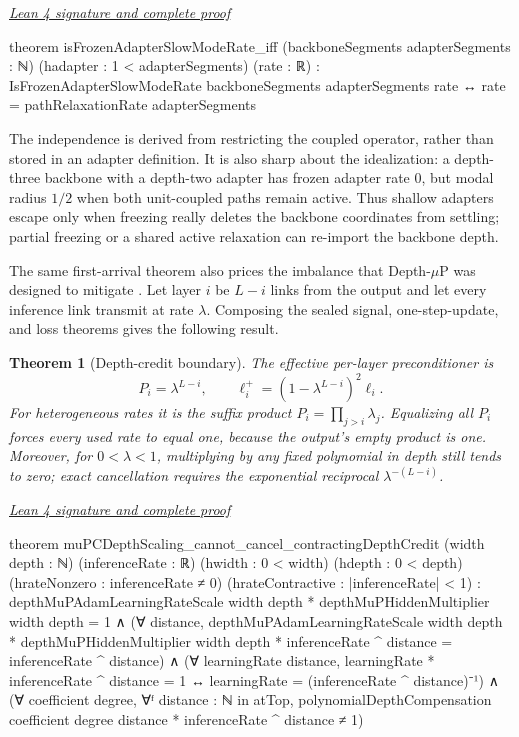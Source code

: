 \documentclass[11pt]{article}
\newtheorem{theorem}{Theorem}[section]
\newcommand{\leancommit}{647168959fc57cfe97526d9525d33e63681b8e2f}
\newcommand{\leansignaturelink}[2]{%
  \par\Needspace{0.3\textheight}\smallskip\noindent
  \href{https://github.com/zariuq/MeTTapedia/blob/\leancommit/#1\#L#2}{%
    \scriptsize\itshape Lean 4 signature and complete proof}\par\nobreak}
\begin{document}
\leansignaturelink{lean/mettapedia/Mettapedia/MachineLearning/NeuralNetworks/%
PredictiveCoding/FrozenAdapterRestriction.lean}{233}
\begin{leansignature}
theorem isFrozenAdapterSlowModeRate_iff
    (backboneSegments adapterSegments : ℕ)
    (hadapter : 1 < adapterSegments) (rate : ℝ) :
    IsFrozenAdapterSlowModeRate backboneSegments adapterSegments rate ↔
      rate = pathRelaxationRate adapterSegments
\end{leansignature}

The independence is derived from restricting the coupled operator, rather than stored
in an adapter definition.  It is also sharp about the idealization: a depth-three
backbone with a depth-two adapter has frozen adapter rate $0$, but modal radius $1/2$
when both unit-coupled paths remain active.  Thus shallow adapters escape only when
freezing really deletes the backbone coordinates from settling; partial freezing or a
shared active relaxation can re-import the backbone depth.

The same first-arrival theorem also prices the imbalance that Depth-$\mu$P was designed
to mitigate \cite{innocentimupc2025}.  Let layer $i$ be $L-i$ links from the output and
let every inference link transmit at rate $\lambda$.  Composing the sealed signal,
one-step-update, and loss theorems gives the following result.

\begin{theorem}[Depth-credit boundary]\label{thm:mupcdepth}
The effective per-layer preconditioner is
\[
P_i=\lambda^{L-i},
\qquad
\ell_i^+=(1-\lambda^{L-i})^2\ell_i.
\]
For heterogeneous rates it is the suffix product $P_i=\prod_{j>i}\lambda_j$.  Equalizing
all $P_i$ forces every used rate to equal one, because the output's empty product is one.
Moreover, for $0<\lambda<1$, multiplying by any fixed polynomial in depth still tends to
zero; exact cancellation requires the exponential reciprocal $\lambda^{-(L-i)}$.
\end{theorem}

\leansignaturelink{lean/mettapedia/Mettapedia/MachineLearning/NeuralNetworks/%
PredictiveCoding/MuPCDepthCredit.lean}{366}
\begin{leansignature}
theorem muPCDepthScaling_cannot_cancel_contractingDepthCredit
    (width depth : ℕ) (inferenceRate : ℝ)
    (hwidth : 0 < width) (hdepth : 0 < depth)
    (hrateNonzero : inferenceRate ≠ 0) (hrateContractive : |inferenceRate| < 1) :
    depthMuPAdamLearningRateScale width depth *
        depthMuPHiddenMultiplier width depth = 1 ∧
      (∀ distance,
        depthMuPAdamLearningRateScale width depth *
            depthMuPHiddenMultiplier width depth *
              inferenceRate ^ distance = inferenceRate ^ distance) ∧
      (∀ learningRate distance,
        learningRate * inferenceRate ^ distance = 1 ↔
          learningRate = (inferenceRate ^ distance)⁻¹) ∧
      (∀ coefficient degree,
        ∀ᶠ distance : ℕ in atTop,
          polynomialDepthCompensation coefficient degree distance *
              inferenceRate ^ distance ≠ 1)
\end{leansignature}
\end{document}
